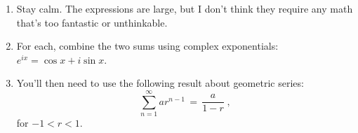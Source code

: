 \begin{enumerate}

\item Stay calm.  The expressions are large, but I don't think they
require any math that's too fantastic or unthinkable.

\item For each, combine the two sums using complex exponentials:
$e^{ix} = \cos x + i \sin x$. 

\item You'll then need to use the following result about geometric
series:
\begin{equation}
  \sum_{n=1}^\infty a r^{n-1} \, = \, \frac{a}{1-r} \;,
\end{equation} 
for $-1 < r < 1$. 


\end{enumerate}





